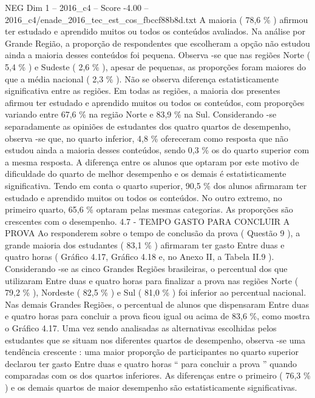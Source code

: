 \begin{textsample}{NEG Dim 1 – 2016\_c4 – Score -4.00 – 2016\_c4/enade\_2016\_tec\_est\_cos\_fbccf88b8d.txt}
A maioria ( 78,6 \% ) afirmou ter estudado e aprendido muitos ou todos os conteúdos avaliados.
Na análise por Grande Região, a proporção de respondentes que escolheram a opção não estudou ainda a maioria desses conteúdos foi pequena.
Observa -se que nas regiões Norte ( 5,4 \% ) e Sudeste ( 2,6 \% ), apesar de pequenas, as proporções foram maiores do que a média nacional ( 2,3 \% ).
Não se observa diferença estatisticamente significativa entre as regiões.
Em todas as regiões, a maioria dos presentes afirmou ter estudado e aprendido muitos ou todos os conteúdos, com proporções variando entre 67,6 \% na região Norte e 83,9 \% na Sul.
Considerando -se separadamente as opiniões de estudantes dos quatro quartos de desempenho, observa -se que, no quarto inferior, 4,8 \% ofereceram como resposta que não estudou ainda a maioria desses conteúdos, sendo 0,3 \% os do quarto superior com a mesma resposta.
A diferença entre os alunos que optaram por este motivo de dificuldade do quarto de melhor desempenho e os demais é estatisticamente significativa.
Tendo em conta o quarto superior, 90,5 \% dos alunos afirmaram ter estudado e aprendido muitos ou todos os conteúdos.
No outro extremo, no primeiro quarto, 65,6 \% optaram pelas mesmas categorias.
As proporções são crescentes com o desempenho. 4.7 - TEMPO GASTO PARA CONCLUIR A PROVA Ao responderem sobre o tempo de conclusão da prova ( Questão 9 ), a grande maioria dos estudantes ( 83,1 \% ) afirmaram ter gasto Entre duas e quatro horas ( Gráfico 4.17, Gráfico 4.18 e, no Anexo II, a Tabela II.9 ).
Considerando -se as cinco Grandes Regiões brasileiras, o percentual dos que utilizaram Entre duas e quatro horas para finalizar a prova nas regiões Norte ( 79,2 \% ), Nordeste ( 82,5 \% ) e Sul ( 81,0 \% ) foi inferior ao percentual nacional.
Nas demais Grandes Regiões, o percentual de alunos que dispensaram Entre duas e quatro horas para concluir a prova ficou igual ou acima de 83,6 \%, como mostra o Gráfico 4.17.
Uma vez sendo analisadas as alternativas escolhidas pelos estudantes que se situam nos diferentes quartos de desempenho, observa -se uma tendência crescente : uma maior proporção de participantes no quarto superior declarou ter gasto Entre duas e quatro horas “ para concluir a prova ” quando comparadas com os dos quartos inferiores.
As diferenças entre o primeiro ( 76,3 \% ) e os demais quartos de maior desempenho são estatisticamente significativas.

\end{textsample}
